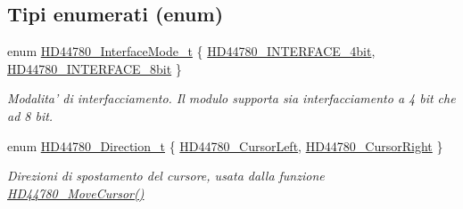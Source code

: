 \subsection*{Tipi enumerati (enum)}
\begin{DoxyCompactItemize}
\item 
enum \hyperlink{group___h_d44780_gaaaea8b73e24f7658da4118f6b01b45f0}{H\+D44780\+\_\+\+Interface\+Mode\+\_\+t} \{ \hyperlink{group___h_d44780_ggaaaea8b73e24f7658da4118f6b01b45f0a45bf6ce7ec7c951f692bdce9f0f485c6}{H\+D44780\+\_\+\+I\+N\+T\+E\+R\+F\+A\+C\+E\+\_\+4bit}, 
\hyperlink{group___h_d44780_ggaaaea8b73e24f7658da4118f6b01b45f0a24da9b234f9358c14184fe21f3c47de5}{H\+D44780\+\_\+\+I\+N\+T\+E\+R\+F\+A\+C\+E\+\_\+8bit}
 \}
\begin{DoxyCompactList}\small\item\em Modalita' di interfacciamento. Il modulo supporta sia interfacciamento a 4 bit che ad 8 bit. \end{DoxyCompactList}\item 
enum \hyperlink{group___h_d44780_gaf46f4db4f981d3a1088804a6d6980d30}{H\+D44780\+\_\+\+Direction\+\_\+t} \{ \hyperlink{group___h_d44780_ggaf46f4db4f981d3a1088804a6d6980d30aa4d704398d4edd1e0dec8dbb55f90292}{H\+D44780\+\_\+\+Cursor\+Left}, 
\hyperlink{group___h_d44780_ggaf46f4db4f981d3a1088804a6d6980d30a26006ced693b6bab28c6e30bfdb8c399}{H\+D44780\+\_\+\+Cursor\+Right}
 \}
\begin{DoxyCompactList}\small\item\em Direzioni di spostamento del cursore, usata dalla funzione \hyperlink{group___h_d44780_gabcea9a03050c46530e39b7556c673baf}{H\+D44780\+\_\+\+Move\+Cursor()} \end{DoxyCompactList}\end{DoxyCompactItemize}
